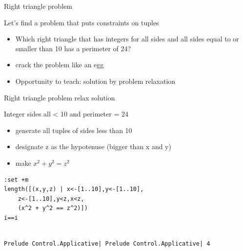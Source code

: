 \documentclass[presetation]{beamer}
\begin{document}
\begin{frame}[label={sec:orgb6eb860}]{Right triangle problem}
\begin{block}{Let's find a problem that puts constraints on tuples}
\begin{itemize}
\item Which right triangle that has integers for all sides and all sides
equal to or smaller than 10 has a perimeter of 24?
\end{itemize}
\pause 
\begin{itemize}
\item crack the problem like an egg
\end{itemize}
\pause
\begin{itemize}
\item Opportunity to teach: \alert{solution by problem relaxation}
\end{itemize}
\end{block}
\end{frame}
\begin{frame}[fragile,label={sec:org1ef8fc9}]{Right triangle problem relax solution}
 \begin{block}{Integer sides all < 10 and perimeter = 24}
\begin{itemize}
\item generate all tuples of sides less than 10
\end{itemize}
\pause
\begin{itemize}
\item designate z as the hypotenuse (bigger than x and y)
\end{itemize}
\pause
\begin{itemize}
\item make \(x^2 + y^2 = z^2\)
\end{itemize}
\begin{verbatim}
:set +m
length([(x,y,z) | x<-[1..10],y<-[1..10],
	z<-[1..10],y<z,x<z,
	(x^2 + y^2 == z^2)])
i==i
\end{verbatim}

\begin{verbatim}

Prelude Control.Applicative| Prelude Control.Applicative| 4
\end{verbatim}
\end{block}
\end{frame}
\end{document}
